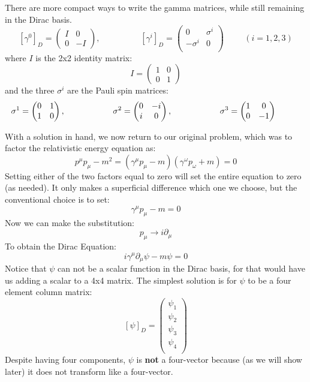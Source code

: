 \documentclass[12pt]{article}
\begin{document}
There are more compact ways to write the gamma matrices, while still
remaining in the Dirac basis.
\begin{equation}
\label{eqn:gammamats}
[\gamma^0]_D = \begin{pmatrix} I & 0 \\ 0 & -I \end{pmatrix}, \hspace{2cm}
[\gamma^i]_D = \begin{pmatrix} 0 & \sigma^i \\ -\sigma^i & 0 \\ \end{pmatrix}
\hspace{1cm} (i=1,2,3)
\end{equation}
where $I$ is the 2x2 identity matrix:
$$I = \begin{pmatrix} 1 & 0 \\ 0 & 1 \end{pmatrix} $$
and the three $\sigma^i$ are the Pauli spin matrices:
$$\sigma^1 = \begin{pmatrix} 0 & 1 \\ 1 & 0 \end{pmatrix}, \hspace{2cm}
\sigma^2 = \begin{pmatrix} 0 & -i \\ i & 0 \end{pmatrix}, \hspace{2cm}
\sigma^3 = \begin{pmatrix} 1 & 0 \\ 0 & -1 \end{pmatrix}\\
\hspace{1cm}
$$

With a solution in hand, we now return to our original problem, which was to factor the relativistic energy equation as:
$$p^\mu p_\mu-m^2 = \left( \gamma^\mu p_\mu - m \right) \left( \gamma^\omega p_\omega + m \right) = 0$$
Setting either of the two factors equal to zero will set the entire equation to zero (as needed).  It only makes a superficial difference which one we choose, but the conventional choice is to set:
$$\gamma^\mu p_\mu - m = 0$$
Now we can make the substitution:
$$p_\mu \to i \partial_\mu$$
To obtain the Dirac Equation:
\begin{equation}
\label{eqn:dirac}
i\gamma^\mu\partial_\mu \psi - m \psi = 0
\end{equation}
Notice that $\psi$ can not be a scalar function in the Dirac basis,
for that would have us adding a scalar to a 4x4 matrix.  The simplest
solution is for $\psi$ to be a four element column matrix:
$$[\psi]_D = \begin{pmatrix} \psi_1 \\ \psi_2 \\ \psi_3 \\ \psi_4 \\ \end{pmatrix}$$
Despite having four components, $\psi$ is {\bf not} a four-vector because (as we will show later) it does not transform like a four-vector.
\end{document}
